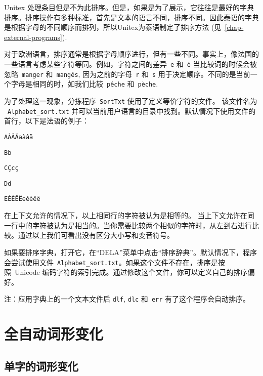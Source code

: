 Unitex 处理条目但是不为此排序。但是，如果是为了展示，它往往是最好的字典排序。排序操作有多种标准，首先是文本的语言不同，排序不同。因此泰语的字典是根据字母的不同顺序而排列，所以Unitex为泰语制定了排序方法 (见\ 
 \ref{chap-external-programs}).

\bigskip
\noindent 对于欧洲语言，排序通常是根据字母顺序进行，但有一些不同。事实上，像法国的一些语言考虑某些字符等同。例如，字符之间的差异\ 
\verb+e+ 和\ \texttt{é} 当比较词的时候会被忽略\ \verb+manger+ 和\ 
\texttt{mangés}, 因为之前的字母\ \verb+r+ 和\ \verb+s+ 用于决定顺序。不同的是当前一个字母是相同的时，如我们比较\ \texttt{pêche} 和\ \texttt{pèche}.

\bigskip \index{Alphabet!tri}
\noindent
为了处理这一现象，分拣程序\  \verb+SortTxt+  
\index{\verb+SortTxt+} 使用了定义等价字符的文件。   该文件名为
\ \verb+Alphabet_sort.txt+   并可以当前用户语言的目录中找到。默认情况下使用文件的首行，以下是法语的例子：


\bigskip
\noindent
\texttt{AÀÂÄaàâä}

\noindent
\texttt{Bb}

\noindent
\texttt{CÇcç}

\noindent
\texttt{Dd}

\noindent
\texttt{EÉÈÊËeéèêë}


\bigskip
\noindent 
在上下文允许的情况下，以上相同行的字符被认为是相等的。
当上下文允许在同一行中的字符被认为是相当的。当你需要比较两个相似的字符时，从左到右进行比较。通过以上我们可看出没有区分大小写和变音符号。


\bigskip
\noindent 如果要排序字典，打开它，在“DELA”菜单中点击“排序辞典”。默认情况下，程序会尝试使用文件\ \verb+Alphabet_sort.txt+。如果这个文件不存在，排序是按照\ Unicode 编码字符的索引完成。通过修改这个文件，你可以定义自己的排序偏好。


\bigskip
\noindent 注：应用字典上的一个文本文件后
\verb+dlf+, \verb+dlc+ 和\ \verb+err+ 有了这个程序会自动排序。
 



\section{全自动词形变化}
\label{section-automatic-inflection}
\subsection{单字的词形变化}

